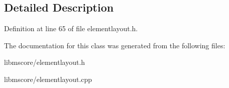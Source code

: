 \subsection{Detailed Description}


Definition at line 65 of file elementlayout.\+h.



The documentation for this class was generated from the following files\+:\begin{DoxyCompactItemize}
\item 
libmscore/elementlayout.\+h\item 
libmscore/elementlayout.\+cpp\end{DoxyCompactItemize}
